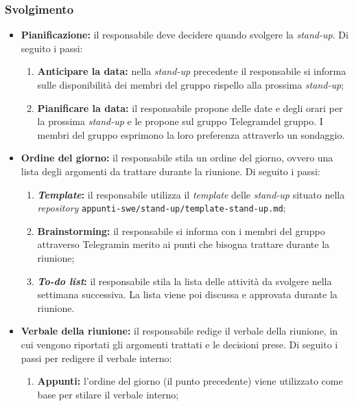 \subsubsection{Svolgimento}
\begin{itemize}

	\item \textbf{Pianificazione:} il responsabile deve decidere quando
	      svolgere la \textit{stand-up}. Di seguito i passi:
	      \begin{enumerate}
		      \item \textbf{Anticipare la data:} nella \textit{stand-up}
		            precedente il responsabile si informa sulle disponibilità
		            dei membri del gruppo rispello alla prossima
		            \textit{stand-up};

		      \item \textbf{Pianificare la data:} il responsabile propone delle
		            date e degli orari per la prossima \textit{stand-up} e le
		            propone sul gruppo Telegram\g del gruppo. I membri
		            del gruppo esprimono la loro preferenza attraverlo un
		            sondaggio.
	      \end{enumerate}

	\item \textbf{Ordine del giorno:} il responsabile stila un ordine del
	      giorno, ovvero una lista degli argomenti da trattare durante la
	      riunione. Di seguito i passi:
	      \begin{enumerate}
		      \item \textbf{\textit{Template}:} il responsabile utilizza il \textit{template}
		            delle \textit{stand-up} situato nella \textit{repository\g}
		            \texttt{appunti-swe/stand-up/template-stand-up.md};

		      \item \textbf{Brainstorming:} il responsabile si informa con i
		            membri del gruppo attraverso Telegram\g in merito ai
		            punti che bisogna trattare durante la riunione;

		      \item \textbf{\textit{To-do list}:} il responsabile stila la lista
		            delle attività da svolgere nella settimana successiva. La
		            lista viene poi discussa e approvata durante la riunione.
	      \end{enumerate}

	\item \textbf{Verbale della riunione:} il responsabile redige il
	      verbale della riunione, in cui vengono riportati gli argomenti
	      trattati e le decisioni prese. Di seguito i passi per redigere il
	      verbale interno:
	      \begin{enumerate}
		      \item \textbf{Appunti:} l'ordine del giorno (il punto precedente)
		            viene utilizzato come base per stilare il verbale interno;


\end{enumerate}
\end{itemize}
